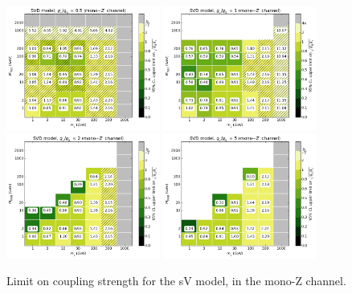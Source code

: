 \begin{figure}[!h]
\begin{center}
\includegraphics[width=0.45\textwidth]{figures/grid_allpoints_SVD_rat05.png}
\includegraphics[width=0.45\textwidth]{figures/grid_allpoints_SVD_rat1.png}
\includegraphics[width=0.45\textwidth]{figures/grid_allpoints_SVD_rat2.png}
\includegraphics[width=0.45\textwidth]{figures/grid_allpoints_SVD_rat5.png}
\caption{Limit on coupling strength for the sV model, in the mono-Z channel.}
\label{fig:MonoZ_SVD_couplinglimit}
\end{center}
\end{figure}

